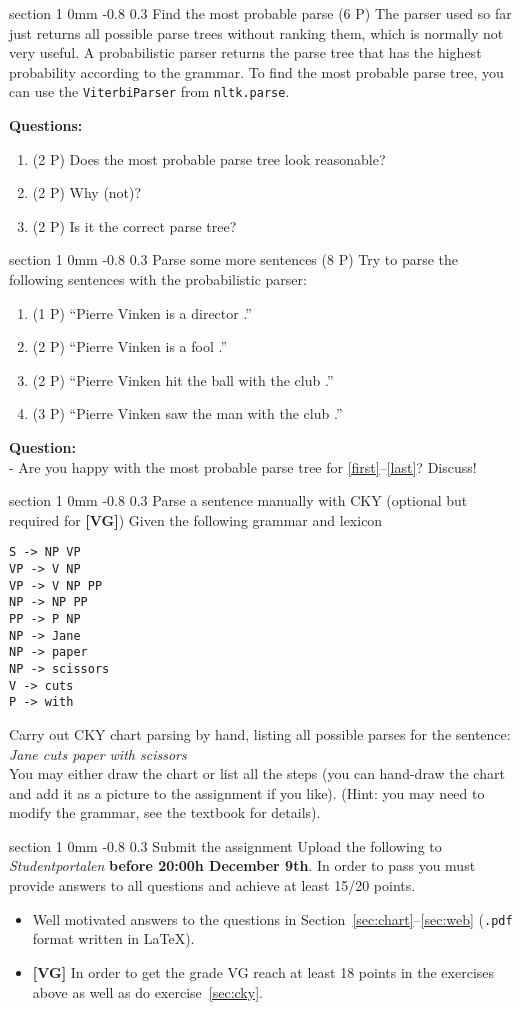 \documentclass[11pt]{article}
\makeatletter
\newcommand{\newsec}[2]{\section{#1}\label{sec:#2}\noindent}
\renewcommand{\section}{\@startsection
{section}%
{1}%
{0mm}%
{-0.8\baselineskip}%
{0.3\baselineskip}%
{\bfseries\large}}%
\makeatother
\begin{document}
\newsec{Find the most probable parse (6 P)}{viterbi}%
The parser used so far just returns all possible parse trees without
ranking them, which is normally not very useful.  A probabilistic
parser returns the parse tree that has the highest probability
according to the grammar. To find the most probable parse tree, you
can use the {\tt ViterbiParser} from {\tt nltk.parse}.
\begin{center}
\fbox{

}
\end{center}
{\bf Questions:}
\begin{enumerate}[noitemsep,topsep=0.2cm]
\item (2 P) Does the most probable parse tree look reasonable? 
\item (2 P) Why (not)? 
\item (2 P) Is it the correct parse tree?
\end{enumerate}

\clearpage \newsec{Parse some more sentences (8 P)}{web}%
Try to parse the following sentences with the probabilistic parser:
\begin{enumerate}[noitemsep,topsep=0.2cm]
\item (1 P) ``Pierre Vinken is a director .''\label{first}
\item (2 P) ``Pierre Vinken is a fool .''
\item (2 P) ``Pierre Vinken hit the ball with the club .''
\item (3 P) ``Pierre Vinken saw the man with the club .''\label{last}
\end{enumerate}

\noindent
{\bf Question:}\\
- Are you happy with the most probable parse tree for
\ref{first}--\ref{last}? Discuss!

\newsec{Parse a sentence manually with CKY (optional but required for \textbf{[VG]})}{cky}
Given the following grammar and lexicon
\begin{lstlisting}
S -> NP VP
VP -> V NP
VP -> V NP PP
NP -> NP PP
PP -> P NP
NP -> Jane
NP -> paper
NP -> scissors
V -> cuts
P -> with
\end{lstlisting}
Carry out CKY chart parsing by hand, listing all possible parses for the
sentence: \textit{Jane cuts paper with scissors}\\
You may either draw the chart or list all the steps (you can hand-draw the chart and add it as a picture to the assignment if you like). (Hint: you may need to modify the grammar, see the textbook for details).


\newsec{Submit the assignment}{sub}%
Upload the following to {\it Studentportalen}
\textbf{before 20:00h December 9th}. In order to pass you must provide
answers to all questions and achieve at least 15/20 points.
\begin{itemize}[noitemsep,topsep=0.2cm]
\item Well motivated answers to the questions in
  Section~\ref{sec:chart}--\ref{sec:web} (\texttt{.pdf} format written
  in \LaTeX).
\item \textbf{[VG]} In order to get the grade VG reach at least 18
    points in the exercises above as well as do exercise~\ref{sec:cky}.
\end{itemize}
\end{document}

